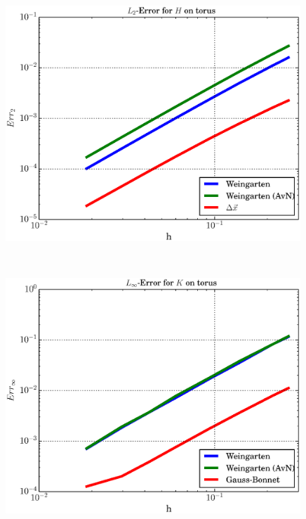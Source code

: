 \begin{figure}
\begin{minipage}[htp]{.23\textwidth}
    \end{minipage}\hfill
    \begin{minipage}[htp]{.23\textwidth}
      \centering
      \includegraphics[width=0.99\textwidth]{bilder/torus/L2H.eps}
    \end{minipage}\\
    \begin{minipage}[htp]{.23\textwidth}
      \centering
      \includegraphics[width=0.99\textwidth]{bilder/torus/LMaxK.eps}
    \end{minipage}\hfill
    \begin{minipage}[htp]{.23\textwidth}
      \centering

\end{minipage}
\end{figure}
